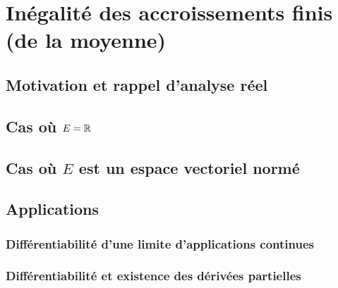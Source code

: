 \chapter{Inégalité des accroissements finis (de la moyenne)}

\section*{Motivation et rappel d'analyse réel}

\section{Cas où $E = \mathbb{R}$}

\section{Cas où $E$ est un espace vectoriel normé}

\section{Applications}

\subsection{Différentiabilité d'une limite d'applications continues}

\subsection{Différentiabilité et existence des dérivées partielles}
